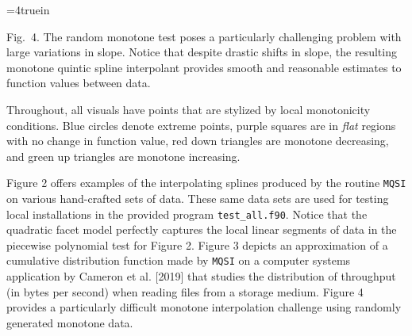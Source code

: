 \topinsert
\centerline{\epsfxsize=4truein }
{\narrower\noindent\rmVIII  Fig.\ 4.
The {\itVIII random monotone} test poses a particularly challenging
problem with large variations in slope. Notice that despite drastic
shifts in slope, the resulting monotone quintic spline interpolant
provides smooth and reasonable estimates to function values between data.
\par}
\iffalse
\vskip 15mm
\centerline{\epsfxsize=4truein \epsffile{vis/7-runtimes-10.eps}}
\centerline{\epsfxsize=4truein \epsffile{vis/8-runtimes-100.eps}}
{\everymath={\scriptstyle} \narrower\noindent\rmVIII Fig.\ 5.
Median total runtime of the routine {\ttVIII MQSI} for number of data points
$n=10$
to 100 (top) and $n=100$ to 1000 (bottom), generated from 100
repeated trials averaged over $14$ different testing functions. The
timings are colored by major algorithmic component, but the vast
majority of execution time is spent solving the banded linear system
of equations in the {\ttVIII FIT\_SPLINE} routine. The runtimes for
the quadratic facet (Algorithm 1) take roughly one microsecond
($10^{-6}$ seconds) per breakpoint, while the binary search
(Algorithm 4) takes roughly four microseconds per breakpoint.
\par}
\fi
\endinsert

Throughout, all visuals have points that are stylized by local
monotonicity conditions. Blue circles denote extreme points, purple
squares are in {\it flat} regions with no change in function value,
red down triangles are monotone decreasing, and green up triangles are
monotone increasing.

Figure 2 offers examples of the interpolating splines produced by the
routine {\tt MQSI} on various hand-crafted sets of data. These same
data sets are used for testing local installations in the provided
program {\tt test\_all.f90}. Notice that the quadratic facet model
perfectly captures the local linear segments of data in the piecewise
polynomial test for Figure 2. Figure 3 depicts an approximation of a
cumulative distribution function made by {\tt MQSI} on a computer
systems application by Cameron et al. [2019] that studies the
distribution of throughput (in bytes per second) when reading files
from a storage medium. Figure 4 provides a particularly difficult
monotone interpolation challenge using randomly generated monotone
data.

